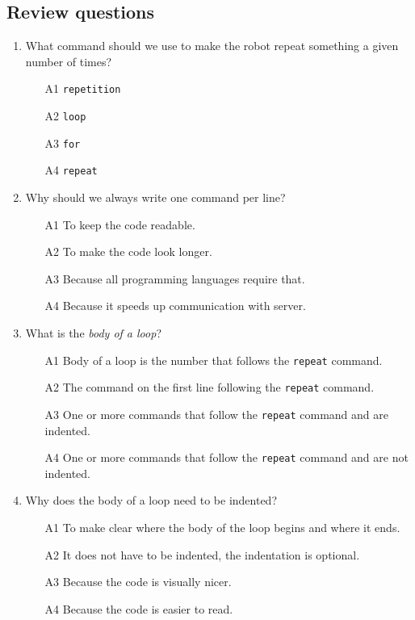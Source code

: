 \documentclass[article,A4,12pt]{llncs}
\begin{document}
{{\subsection{Review questions} 

\begin{enumerate}
\item What command should we use to make the robot repeat something a given number of times?
\begin{enumerate}
\item[A1] {\tt repetition}
\item[A2] {\tt loop}
\item[A3] {\tt for}
\item[A4] {\tt repeat}
\end{enumerate}
\item Why should we always write one command per line?
\begin{enumerate}
\item[A1] To keep the code readable.
\item[A2] To make the code look longer.
\item[A3] Because all programming languages require that.
\item[A4] Because it speeds up communication with server.
\end{enumerate}
\item What is the {\em body of a loop}?
\begin{enumerate}
\item[A1] Body of a loop is the number that follows the {\tt repeat} command. 
\item[A2] The command on the first line following the {\tt repeat} command.
\item[A3] One or more commands that follow the {\tt repeat} command and are indented.
\item[A4] One or more commands that follow the {\tt repeat} command and are not indented.
\end{enumerate}
\item Why does the body of a loop need to be indented?
\begin{enumerate}
\item[A1] To make clear where the body of the loop begins and where it ends.
\item[A2] It does not have to be indented, the indentation is optional.
\item[A3] Because the code is visually nicer.
\item[A4] Because the code is easier to read.
\end{enumerate}

\end{enumerate}}}
\end{document}
